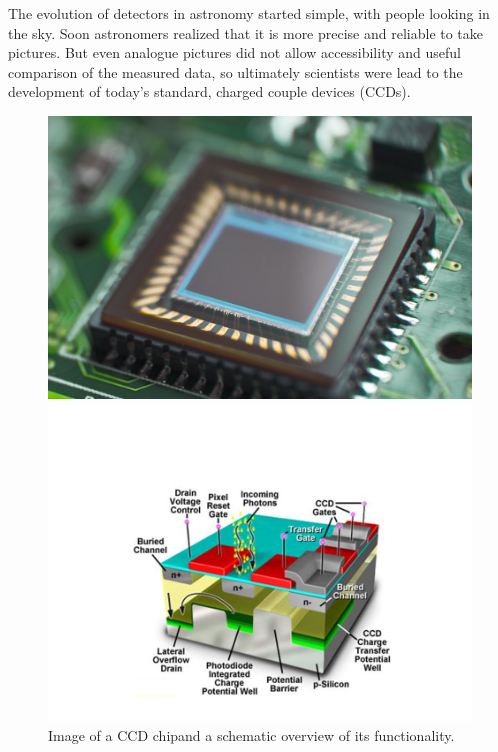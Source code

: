 The evolution of detectors in astronomy started simple, with people looking in the sky. Soon astronomers realized that it is more precise and reliable to take pictures. But even analogue pictures did not allow accessibility and useful comparison of the measured data, so ultimately scientists were lead to the development of today's standard, charged couple devices (CCDs). 
\begin{figure}[H]
\vspace{-1cm}
\begin{minipage}{0.4\textwidth}
\hspace{0.7cm}
		\includegraphics[scale = 0.48]{figures/Introduction/ccd1}
\end{minipage}
\begin{minipage}{0.4\textwidth}
\vspace{-1cm}
		\includegraphics[scale=0.35]{figures/Introduction/ccd2}
\end{minipage}
\caption[Image of a CCD and a schematic overview of its functionality.]{Image of a CCD chip\footnotemark and a schematic overview of its functionality\footnotemark .} 
\end{figure} 
